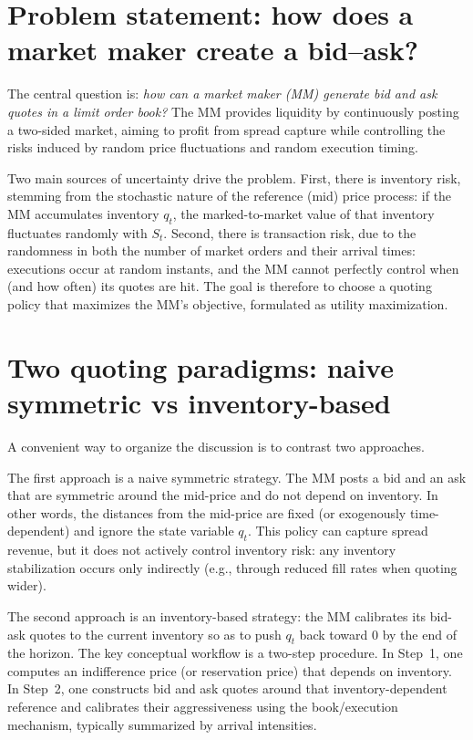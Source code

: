 \documentclass[a4paper,10pt,titlepage,oneside,openany]{book}
\theoremstyle{plain}\newtheorem{theorem}{Theorem}[chapter]
\theoremstyle{definition}\newtheorem{definition}{Definition}[chapter]
\theoremstyle{remark}\newtheorem{remark}{Remark}[chapter]
\begin{document}
\section{Problem statement: how does a market maker create a bid--ask?}
The central question is: \emph{how can a market maker (MM) generate bid and ask quotes in a limit order book?} The MM provides liquidity by continuously posting a two-sided market, aiming to profit from spread capture while controlling the risks induced by random price fluctuations and random execution timing.

Two main sources of uncertainty drive the problem. First, there is inventory risk, stemming from the stochastic nature of the reference (mid) price process: if the MM accumulates inventory $q_t$, the marked-to-market value of that inventory fluctuates randomly with $S_t$. Second, there is transaction risk, due to the randomness in both the number of market orders and their arrival times: executions occur at random instants, and the MM cannot perfectly control when (and how often) its quotes are hit. The goal is therefore to choose a quoting policy that maximizes the MM's objective, formulated as utility maximization.

\section{Two quoting paradigms: naive symmetric vs inventory-based}
A convenient way to organize the discussion is to contrast two approaches.

The first approach is a naive symmetric strategy. The MM posts a bid and an ask that are symmetric around the mid-price and do not depend on inventory. In other words, the distances from the mid-price are fixed (or exogenously time-dependent) and ignore the state variable $q_t$. This policy can capture spread revenue, but it does not actively control inventory risk: any inventory stabilization occurs only indirectly (e.g., through reduced fill rates when quoting wider).

The second approach is an inventory-based strategy: the MM calibrates its bid-ask quotes to the current inventory so as to push $q_t$ back toward $0$ by the end of the horizon. The key conceptual workflow is a two-step procedure. In Step~1, one computes an indifference price (or reservation price) that depends on inventory. In Step~2, one constructs bid and ask quotes around that inventory-dependent reference and calibrates their aggressiveness using the book/execution mechanism, typically summarized by arrival intensities.
\end{document}

